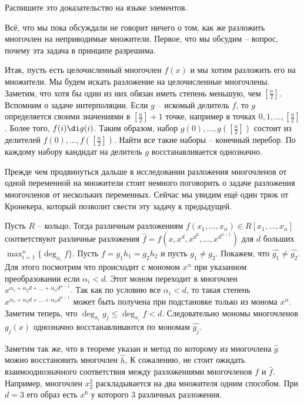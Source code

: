 \upr Распишите это доказательство на языке элементов.
\eupr

Всё, что мы пока обсуждали не говорит ничего о том, как же разложить многочлен на неприводимые множители. Первое, что мы обсудим -- вопрос, почему эта задача в принципе разрешима.

Итак, пусть есть целочисленный многочлен $f(x)$ и мы хотим разложить его на множители. Мы будем искать разложение на целочисленные многочлены. Заметим, что хотя бы один из них обязан иметь степень меньшую, чем $[\frac{n}{2}]$. Вспомним о задаче интерполяции. Если $g$ -- искомый делитель $f$, то $g$ определяется своими значениями в $[\frac{n}{2}]+1$ точке, например в точках $0,1,\dots, [\frac{n}{2}]$. Более того, $f(i) \di g(i)$. Таким образом, набор $g(0),\dots, g([\frac{n}{2}])$ состоит из делителей $f(0),\dots,f([\frac{n}{2}])$. Найти все такие наборы -- конечный перебор. По каждому набору кандидат на делитель $g$ восстанавливается однозначно.

Прежде чем продвинуться дальше в исследовании разложения многочленов от одной переменной на множители стоит немного поговорить о задаче разложения многочленов от нескольких переменных. Сейчас мы увидим ещё один трюк от Кронекера, который позволит свести эту задачу к предыдущей.

\thrm[Трюк] Пусть $R$ -- кольцо. Тогда различным разложениям $f(x_1,\dots,x_n)\in R[x_1,\dots,x_n]$   соответствуют различные разложения $\hat{f}=f(x, x^d, x^{d^2}, \dots, x^{d^{n-1}})$ для $d$ больших $\max_{i=1}^n \{\deg_{x_i} f\}$.
\proof Пусть $f=g_1h_1=g_2h_2$ и пусть $g_1\neq g_2$. Покажем, что $\hat{g_1}\neq \hat{g_2}$. Для этого посмотрим что происходит с мономом $x^{\alpha}$ при указанном преобразовании если $\alpha_i < d$. Этот моном переходит в многочлен $x^{\alpha_1+\alpha_2d+\dots+\alpha_n d^{n-1}}$. Так как по условию все $\alpha_i<d$, то такая степень  $x^{\alpha_1+\alpha_2d+\dots+\alpha_n d^{n-1}}$ может быть получена при подстановке только из монома $x^{\alpha}$. Заметим теперь, что $\deg_{x_i} g_j \leq \deg_{x_i} f <d$. Следовательно мономы многочленов $g_j(x)$ однозначно восстанавливаются по мономам $\hat{g_j}$.
\endproof
\ethrm

Заметим так же, что в теореме указан и метод по которому из многочлена $\hat{g}$ можно восстановить многочлен $\hat h$,
К сожалению, не стоит ожидать взаимооднозначного соответствия между разложениями многочленов $f$ и $\hat{f}$. Например, многочлен $x_2^2$ раскладывается на два множителя одним способом. При $d=3$ его образ есть $x^6$ у которого 3 различных разложения.

